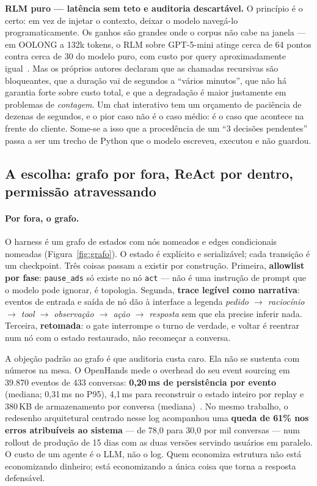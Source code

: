 \documentclass[10pt,twocolumn]{article}
\newcommand{\code}[1]{\texttt{\footnotesize #1}}
\begin{document}
\textbf{RLM puro --- latência sem teto e auditoria descartável.} O princípio é o certo: em
vez de injetar o contexto, deixar o modelo navegá-lo programaticamente. Os ganhos são
grandes onde o corpus não cabe na janela --- em OOLONG a 132k tokens, o RLM sobre GPT-5-mini
atinge cerca de 64 pontos contra cerca de 30 do modelo puro, com custo por query
aproximadamente igual~\cite{zhang2025rlm}. Mas os próprios autores declaram que as chamadas
recursivas são bloqueantes, que a duração vai de segundos a ``vários minutos'', que não há
garantia forte sobre custo total, e que a degradação é maior justamente em problemas de
\emph{contagem}. Um chat interativo tem um orçamento de paciência de dezenas de segundos, e
o pior caso não é o caso médio: é o caso que acontece na frente do cliente. Some-se a isso
que a procedência de um ``3 decisões pendentes'' passa a ser um trecho de Python que o
modelo escreveu, executou e não guardou.

\subsection{A escolha: grafo por fora, ReAct por dentro, permissão atravessando}

\paragraph{Por fora, o grafo.} O harness é um grafo de estados com nós nomeados e edges
condicionais nomeadas (Figura~\ref{fig:grafo}). O estado é explícito e serializável; cada
transição é um checkpoint. Três coisas passam a existir por construção. Primeira,
\textbf{allowlist por fase}: \code{pause\_ads} só existe no nó \code{act} --- não é uma
instrução de prompt que o modelo pode ignorar, é topologia. Segunda, \textbf{trace legível
como narrativa}: eventos de entrada e saída de nó dão à interface a legenda
\emph{pedido $\rightarrow$ raciocínio $\rightarrow$ tool $\rightarrow$ observação
$\rightarrow$ ação $\rightarrow$ resposta} sem que ela precise inferir nada. Terceira,
\textbf{retomada}: o gate interrompe o turno de verdade, e voltar é reentrar num nó com o
estado restaurado, não recomeçar a conversa.

A objeção padrão ao grafo é que auditoria custa caro. Ela não se sustenta com números na
mesa. O OpenHands mede o overhead do seu event sourcing em 39.870 eventos de 433 conversas:
\textbf{0,20\,ms de persistência por evento} (mediana; 0,31\,ms no P95), 4,1\,ms para
reconstruir o estado inteiro por replay e 380\,KB de armazenamento por conversa
(mediana)~\cite{wang2026openhands}. No mesmo trabalho, o redesenho arquitetural centrado
nesse log acompanhou uma \textbf{queda de 61\% nos erros atribuíveis ao sistema} --- de 78,0
para 30,0 por mil conversas --- num rollout de produção de 15 dias com as duas versões
servindo usuários em paralelo. O custo de um agente é o LLM, não o log. Quem economiza
estrutura não está economizando dinheiro; está economizando a única coisa que torna a
resposta defensável.
\end{document}
